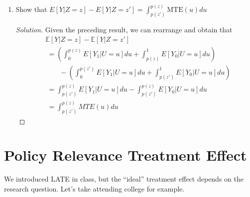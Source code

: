 \documentclass[11pt]{article}
\newenvironment{solution}{%
  \renewcommand\qedsymbol{$\blacksquare$}%
  \begin{mdframed}[backgroundcolor=gray!15]%
  \begin{proof}[Solution]}%
  {\end{proof}%
  \end{mdframed}}%
\newcommand{\ept}{\mathbb{E}}
\newcommand{\given}{\,|\,}
\begin{document}
\begin{enumerate}
            \begin{solution}
                Given the preceding result, we further derive that:
                \[ \begin{aligned}
                    &\ept(Y_1 \given U \leq p(z)) \cdot p(z) + \ept(Y_0 \given U \geq p(z)) \cdot (1-p(z))  \\
                    =\ & \int_{0}^{p(z)} \ept[Y_1 \given U =u] \,\text{d}u + \int_{p(z)}^{1} \ept[Y_0 \given U =u] \,\text{d}u 
                \end{aligned} \]
                where the former term capture the average $Y_1$ for those with $u \in [0, p(z)]$; while the latter term capture the average $Y_0$ for those with $u \in [p(z), 1]$
            \end{solution}
        
        \item Show that \( E[Y|Z=z] - E[Y|Z=z'] = \int_{p(z')}^{p(z)} \text{MTE}(u) du \)
        
            \begin{solution}
                Given the preceding result, we can rearrange and obtain that
                \[ \begin{aligned}
                    &\ept[Y|Z=z] - \ept[Y|Z=z']  \\
                    &\ = \left( \int_{0}^{p(z)} E[Y_1|U=u]du + \int_{p(z)}^{1} E[Y_0|U=u]du \right)  \\
                    &\qquad - \left( \int_{0}^{p(z')} E[Y_1|U=u]du + \int_{p(z')}^{1} E[Y_0|U=u]du \right)  \\
                    &\ = \int_{p(z')}^{p(z)} E[Y_1|U=u]du - \int_{p(z')}^{p(z)} E[Y_0|U=u]du  \\
                    &\ = \int_{p(z')}^{p(z)} MTE(u)du
                \end{aligned} \]
            \end{solution}
        

    \end{enumerate}
    
\section{Policy Relevance Treatment Effect}

    We introduced LATE in class, but the ``ideal'' treatment effect depends on the research question. Let's take attending college for example.
\end{document}
